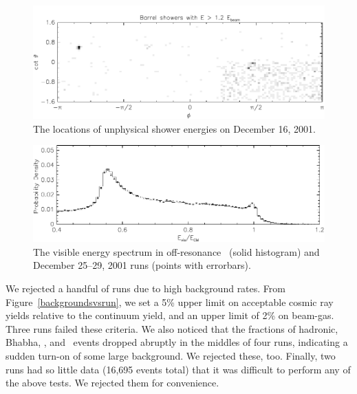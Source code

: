 \documentclass{cornell}
\begin{document}
\begin{figure}[p]
  \begin{center}
    \includegraphics[width=0.85\linewidth]{newplots/higheshowers}
  \end{center}
  \caption[Geometry of unphysically energetic showers on December 16,
  2001]{\label{higheshowers} The locations of unphysical shower
  energies on December 16, 2001.}
\end{figure}

\begin{figure}[p]
  \begin{center}
    \includegraphics[width=0.85\linewidth]{newplots/higheendcapvisen}
  \end{center}
  \caption[Visible energy distribution on December 25--29,
  2001]{\label{higheendcapvisen} The visible energy spectrum in
  off-resonance \usss\ (solid histogram) and December 25--29, 2001
  runs (points with errorbars).}
\end{figure}

We rejected a handful of runs due to high background rates.  From
Figure~\ref{backgroundsvsrun}, we set a 5\% upper limit on acceptable
cosmic ray yields relative to the continuum yield, and an upper limit
of 2\% on beam-gas.  Three runs failed these criteria.  We also
noticed that the fractions of hadronic, Bhabha, \gamgam, and \mumu\
events dropped abruptly in the middles of four runs, indicating a
sudden turn-on of some large background.  We rejected these, too.
Finally, two runs had so little data (16,695 events total) that it was
difficult to perform any of the above tests.  We rejected them for
convenience.
\end{document}
